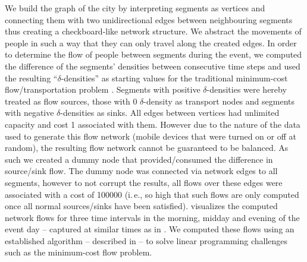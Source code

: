 \documentclass[12pt,a4paper,twoside,openright]{book}
\begin{document}
We build the graph of the city by interpreting segments as vertices and connecting them with two unidirectional edges between neighbouring segments thus creating a checkboard-like network structure.
%
We abstract the movements of people in such a way that they can only travel along the created edges.
%
In order to determine the flow of people between segments during the event, we computed the difference of the segments' densities between consecutive time steps and used the resulting ``$\delta$-densities'' as starting values for the traditional minimum-cost flow/transportation problem \cite{Monge1781}.
%
Segments with positive $\delta$-densities were hereby treated as flow sources, those with 0 $\delta$-density as transport nodes and segments with negative $\delta$-densities as sinks.
%
All edges between vertices had unlimited capacity and cost 1 associated with them.
%
However due to the nature of the data used to generate this flow network (mobile devices that were turned on or off at random), the resulting flow network cannot be guaranteed to be balanced.
%
As such we created a dummy node that provided/consumed the difference in source/sink flow.
%
The dummy node was connected via network edges to all segments, however to not corrupt the results, all flows over these edges were associated with a cost of 100000 (i.\,e., so high that such flows are only computed once all normal sources/sinks have been satisfied).
%
 visualizes the computed network flows for three time intervals in the morning, midday and evening of the event day -- captured at similar times as in .
%
We computed these flows using an established algorithm -- described in \cite{berkelaar2004} -- to solve linear programming challenges such as the minimum-cost flow problem.
\end{document}
